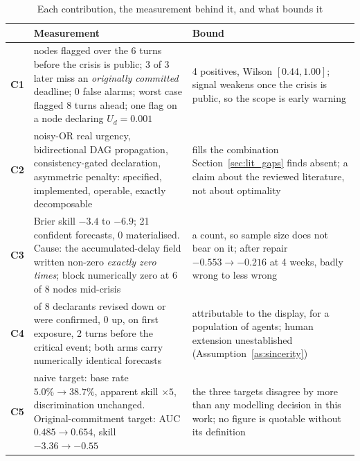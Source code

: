\begin{table}[htbp]
\centering
\caption[The five contributions, measured and bounded]{Each contribution, the measurement
behind it, and what bounds it}
\label{tab:contributions}
\footnotesize
\begin{tabularx}{\linewidth}{@{}l >{\raggedright\arraybackslash}p{4.6cm} X@{}}
\toprule
& \textbf{Measurement} & \textbf{Bound} \\
\midrule
\textbf{C1} & 3 nodes flagged over the 6 turns before the crisis is public; 3 of 3 later miss
an \emph{originally committed} deadline; 0 false alarms; worst case flagged 8 turns ahead; one
flag on a node declaring $U_d = 0.001$
& 4 positives, Wilson $[0.44, 1.00]$; signal weakens once the crisis is public, so the scope
is early warning \\
\addlinespace
\textbf{C2} & noisy-OR real urgency, bidirectional DAG propagation, consistency-gated
declaration, asymmetric penalty: specified, implemented, operable, exactly decomposable
& fills the combination Section~\ref{sec:lit_gaps} finds absent; a claim about the reviewed
literature, not about optimality \\
\addlinespace
\textbf{C3} & Brier skill $-3.4$ to $-6.9$; 21 confident forecasts, 0 materialised. Cause: the
accumulated-delay field written non-zero \emph{exactly zero times}; block numerically zero at
6 of 8 nodes mid-crisis
& a count, so sample size does not bear on it; after repair $-0.553 \to -0.216$ at 4 weeks,
badly wrong to less wrong \\
\addlinespace
\textbf{C4} & 8 of 8 declarants revised down or were confirmed, 0 up, on first exposure, 2
turns before the critical event; both arms carry numerically identical forecasts
& attributable to the display, for a population of agents; human extension unestablished
(Assumption~\ref{as:sincerity}) \\
\addlinespace
\textbf{C5} & naive target: base rate $5.0\% \to 38.7\%$, apparent skill $\times 5$,
discrimination unchanged. Original-commitment target: AUC $0.485 \to 0.654$, skill
$-3.36 \to -0.55$
& the three targets disagree by more than any modelling decision in this work; no figure is
quotable without its definition \\
\bottomrule
\end{tabularx}
\end{table}

